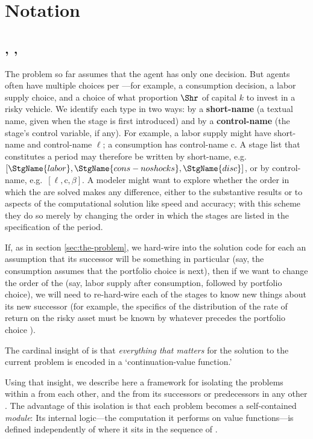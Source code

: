 \documentclass[titlepage, headings=optiontotocandhead]{econark}
\begin{document}
\hypertarget{notation}{}
\section{Notation}\label{sec:notation}

\hypertarget{intervals-stages-perches}{}
\subsection{\Intervals, \Stgs, \Prchs}

The problem so far assumes that the agent has only one decision.  But agents often have multiple choices per {\interval}---for example, a consumption decision, a labor supply choice, and a choice of what proportion $\Shr$ of capital $k$ to invest in a risky vehicle.  We identify each {\stg} type in two ways: by a \textbf{short-name} (a textual name, given when the stage is first introduced) and by a \textbf{control-name} (the stage's control variable, if any).  For example, a labor supply {\stg} might have short-name  and control-name $\ell$; a consumption {\stg} has control-name $\mathrm{c}$.  A stage list that constitutes a period may therefore be written by short-name, e.g.\ $[\StgName{labor}, \StgName{cons-noshocks}, \StgName{disc}]$, or by control-name, e.g.\ $[\ell, \mathrm{c}, \beta]$. A modeler might want to explore whether the order in which the {\stgs} are solved makes any difference, either to the substantive results or to aspects of the computational solution like speed and accuracy; with this scheme they do so merely by changing the order in which the stages are listed in the specification of the period.

If, as in section \ref{sec:the-problem}, we hard-wire into the solution code for each {\stg} an assumption that its successor {\stg} will be something in particular (say, the consumption {\stg} assumes that the portfolio choice is next), then if we want to change the order of the {\stgs} (say, labor supply after consumption, followed by portfolio choice), we will need to re-hard-wire each of the stages to know new things about its new successor (for example, the specifics of the distribution of the rate of return on the risky asset must be known by whatever {\stg} precedes the portfolio choice {\stg}).

The cardinal insight of \citet{bellman1957} is that \emph{everything that matters} for the solution to the current problem is encoded in a `continuation-value function.'

Using that insight, we describe here a framework for isolating the {\stg} problems within a {\interval} from each other, and the {\interval} from its successors or predecessors in any other {\interval}.  The advantage of this isolation is that each {\stg} problem becomes a self-contained \textit{module}: Its internal logic---the computation it performs on value functions---is defined independently of where it sits in the sequence of {\stgs}.
\end{document}
